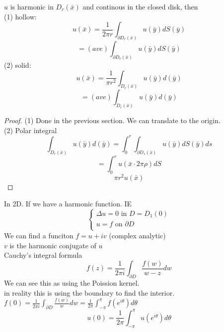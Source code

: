 \documentclass[answers, 12pts,addpoints]{exam}
\begin{document}
\begin{theorem}
    $u$ is harmonic in $D_r(\bar{x})$ and continous in the closed disk, then \\
    (1) hollow: 
    $$ u(\bar{x}) = \frac{1}{2\pi r} \int_{\partial D_r(\bar{x})} u(\bar{y}) dS(\bar{y})$$
    $$ = (ave)\int_{\partial D_r(\bar{x})} u(\bar{y}) dS(\bar{y})$$
    (2) solid:
    $$ u(\bar{x}) = \frac{1}{\pi r^2} \int_{D_r(\bar{x})} u(\bar{y}) d(\bar{y})$$
    $$ = (ave)\int_{D_r(\bar{x})} u(\bar{y}) d(\bar{y})$$
    \begin{proof}
        (1) Done in the previous section. We can translate to the origin.\\
        (2) Polar integral\\
        $$\int_{D_r(\bar{x})} u(\bar{y}) d(\bar{y}) = \int_0^r \int_{\partial D_s(\bar{x})} u(\bar{y}) dS(\bar{y}) ds$$
        $$ = \int_0^r u(\bar{x} \cdot 2\pi \rho) dS$$
        $$ \pi r^2 u(\bar{x})$$
    \end{proof}
    \begin{remark}
        In 2D. If we have a harmonic function. IE\\
        $$\begin{cases}
            \Delta u = 0 \text{ in } D = D_1(0)\\
            u = f \text{ on } \partial D\\
        \end{cases}$$
        We can find a funciton $f = u + iv$ (complex analytic)\\
        $v$ is the harmonic conjugate of $u$\\
        Cauchy's integral formula\\
        $$ f(z) = \frac{1}{2\pi i} \int_{\partial D} \frac{f(w)}{w - z} dw$$
        We can see this as using the Poission kernel.\\
        in reality this is using the boundary to find the interior.\\
        $f(0) = \frac{1}{2\pi i} \int_{\partial D} \frac{f(w)}{w} dw = \frac{1}{2\pi} \int_{-\pi}^{\pi} f(e^{i\theta}) d\theta $\\
        $$u(0) = \frac{1}{2\pi} \int_{-\pi}^{\pi} u(e^{i\theta}) d\theta$$
    \end{remark}
\end{theorem}
\end{document}
